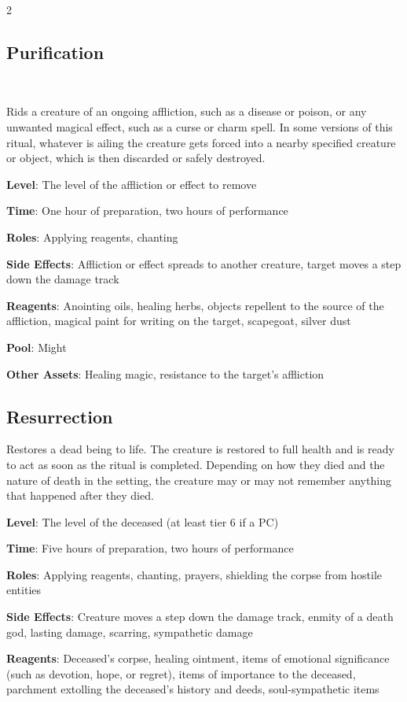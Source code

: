 \begin{multicols}{2}
\subsection{Purification} 

Rids a creature of an ongoing affliction, such as a disease or poison, or any unwanted magical effect, such as a curse or charm spell. In some versions of this ritual, whatever is ailing the creature gets forced into a nearby specified creature or object, which is then discarded or safely destroyed.

\textbf{Level}: The level of the affliction or effect to remove 

\textbf{Time}: One hour of preparation, two hours of performance 

\textbf{Roles}: Applying reagents, chanting 

\textbf{Side Effects}: Affliction or effect spreads to another creature, target moves a step down the damage track 

\textbf{Reagents}: Anointing oils, healing herbs, objects repellent to the source of the affliction, magical paint for writing on the target, scapegoat, silver dust 

\textbf{Pool}: Might 

\textbf{Other Assets}: Healing magic, resistance to the target’s affliction

\subsection{Resurrection}

Restores a dead being to life. The creature is restored to full health and is ready to act as soon as the ritual is completed. Depending on how they died and the nature of death in the setting, the creature may or may not remember anything that happened after they died. 

\textbf{Level}: The level of the deceased (at least tier 6 if a PC) 

\textbf{Time}: Five hours of preparation, two hours of performance 

\textbf{Roles}: Applying reagents, chanting, prayers, shielding the corpse from hostile entities 

\textbf{Side Effects}: Creature moves a step down the damage track, enmity of a death god, lasting damage, scarring, sympathetic damage 

\textbf{Reagents}: Deceased’s corpse, healing ointment, items of emotional significance (such as devotion, hope, or regret), items of importance to the deceased, parchment extolling the deceased’s history and deeds, soul-sympathetic items 


\end{multicols}
